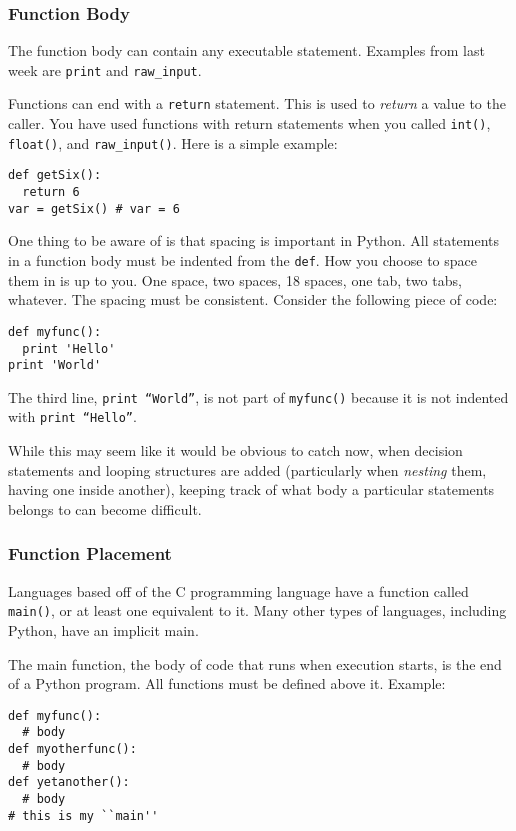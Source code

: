 \documentclass[11pt, letterpaper]{article}
\begin{document}
\subsubsection*{Function Body}

The function body can contain any executable statement. Examples from last week are {\tt print} and {\tt raw\_input}.

Functions can end with a {\tt return} statement. This is used to {\em return} a value to the caller. You have used functions with return statements when you called {\tt int()}, {\tt float()}, and {\tt raw\_input()}. Here is a simple example:

\begin{lstlisting}
def getSix():
  return 6
var = getSix() # var = 6
\end{lstlisting}

One thing to be aware of is that spacing is important in Python. All statements in a function body must be indented from the {\tt def}. How you choose to space them in is up to you. One space, two spaces, 18 spaces, one tab, two tabs, whatever. The spacing must be consistent. Consider the following piece of code:

\begin{lstlisting}
def myfunc():
  print 'Hello'
print 'World'
\end{lstlisting}

The third line, {\tt print ``World''}, is not part of {\tt myfunc()} because it is not indented with {\tt print ``Hello''}.

While this may seem like it would be obvious to catch now, when decision statements and looping structures are added (particularly when {\em nesting} them, having one inside another), keeping track of what body a particular statements belongs to can become difficult.

\subsubsection*{Function Placement}

Languages based off of the C programming language have a function called {\tt main()}, or at least one equivalent to it. Many other types of languages, including Python, have an implicit main.

The main function, the body of code that runs when execution starts, is the end of a Python program. All functions must be defined above it. Example:

\begin{lstlisting}
def myfunc():
  # body
def myotherfunc():
  # body
def yetanother():
  # body
# this is my ``main''
\end{lstlisting}
\end{document}
